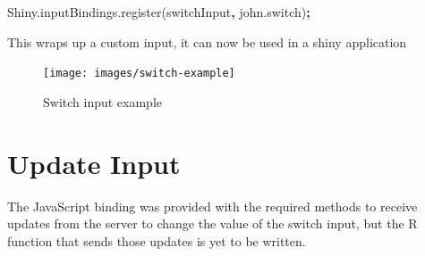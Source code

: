 \documentclass[
  10pt,
]{krantz}
\makeatletter
\newenvironment{Shaded}{\begin{snugshade}}{\end{snugshade}}
\newcommand{\AttributeTok}[1]{\textcolor[rgb]{0.61,0.61,0.61}{#1}}
\newcommand{\ControlFlowTok}[1]{\textcolor[rgb]{0.27,0.27,0.27}{\textbf{#1}}}
\newcommand{\KeywordTok}[1]{\textcolor[rgb]{0.27,0.27,0.27}{\textbf{#1}}}
\newcommand{\NormalTok}[1]{#1}
\newcommand{\OperatorTok}[1]{\textcolor[rgb]{0.43,0.43,0.43}{\textbf{#1}}}
\newcommand{\OtherTok}[1]{\textcolor[rgb]{0.37,0.37,0.37}{#1}}
\newcommand{\StringTok}[1]{\textcolor[rgb]{0.5,0.5,0.5}{#1}}
\newcommand{\VariableTok}[1]{\textcolor[rgb]{0,0,0}{#1}}
\newenvironment{kframe}{%
\medskip{}
\setlength{\fboxsep}{.8em}
 \def\at@end@of@kframe{}%
 \ifinner\ifhmode%
  \def\at@end@of@kframe{\end{minipage}}%
  \begin{minipage}{\columnwidth}%
 \fi\fi%
 \def\FrameCommand##1{\hskip\@totalleftmargin \hskip-\fboxsep
 \colorbox{shadecolor}{##1}\hskip-\fboxsep
     \hskip-\linewidth \hskip-\@totalleftmargin \hskip\columnwidth}%
 \MakeFramed {\advance\hsize-\width
   \@totalleftmargin\z@ \linewidth\hsize
   \@setminipage}}%
 {\par\unskip\endMakeFramed%
 \at@end@of@kframe}
\renewenvironment{Shaded}{\begin{kframe}}{\end{kframe}}
\makeatother
\begin{document}
\begin{Shaded}
\begin{Highlighting}[]
\VariableTok{Shiny}\NormalTok{.}\VariableTok{inputBindings}\NormalTok{.}\AttributeTok{register}\NormalTok{(switchInput}\OperatorTok{,} \StringTok{\textquotesingle{}john.switch\textquotesingle{}}\NormalTok{)}\OperatorTok{;}
\end{Highlighting}
\end{Shaded}

This wraps up a custom input, it can now be used in a shiny application

\begin{Shaded}
\end{Shaded}

\begin{figure}[H]

{\centering \texttt{[image: images/switch-example]} 

}

\caption{Switch input example}\label{fig:switch-example}
\end{figure}

\hypertarget{shiny-input-update}{%
\section{Update Input}\label{shiny-input-update}}

The JavaScript binding was provided with the required methods to receive updates from the server to change the value of the switch input, but the R function that sends those updates is yet to be written.
\end{document}
